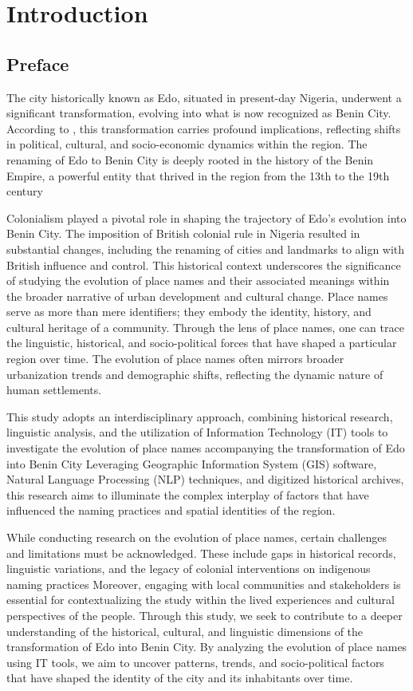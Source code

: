 \chapter{Introduction}
\section{Preface}
The city historically known as Edo, situated in present-day Nigeria, underwent a significant transformation, evolving into what is now recognized as Benin City. According to \cite{Michael2023}, this transformation carries profound implications, reflecting shifts in political, cultural, and socio-economic dynamics within the region. The renaming of Edo to Benin City is deeply rooted in the history of the Benin Empire, a powerful entity that thrived in the region from the 13th to the 19th century\cite{egharevba1968short} 

Colonialism played a pivotal role in shaping the trajectory of Edo's evolution into Benin City. The imposition of British colonial rule in Nigeria resulted in substantial changes, including the renaming of cities and landmarks to align with British influence and control\cite{falola2008history}. This historical context underscores the significance of studying the evolution of place names and their associated meanings within the broader narrative of urban development and cultural change.
Place names serve as more than mere identifiers; they embody the identity, history, and cultural heritage of a community\cite{Gelling}. Through the lens of place names, one can trace the linguistic, historical, and socio-political forces that have shaped a particular region over time. The evolution of place names often mirrors broader urbanization trends and demographic shifts, reflecting the dynamic nature of human settlements.

This study adopts an interdisciplinary approach, combining historical research, linguistic analysis, and the utilization of Information Technology (IT) tools to investigate the evolution of place names accompanying the transformation of Edo into Benin City Leveraging Geographic Information System (GIS) software, Natural Language Processing (NLP) techniques, and digitized historical archives, this research aims to illuminate the complex interplay of factors that have influenced the naming practices and spatial identities of the region.


While conducting research on the evolution of place names, certain challenges and limitations must be acknowledged. These include gaps in historical records, linguistic variations, and the legacy of colonial interventions on indigenous naming practices Moreover, engaging with local communities and stakeholders is essential for contextualizing the study within the lived experiences and cultural perspectives of the people.
Through this study, we seek to contribute to a deeper understanding of the historical, cultural, and linguistic dimensions of the transformation of Edo into Benin City. By analyzing the evolution of place names using IT tools, we aim to uncover patterns, trends, and socio-political factors that have shaped the identity of the city and its inhabitants over time.

